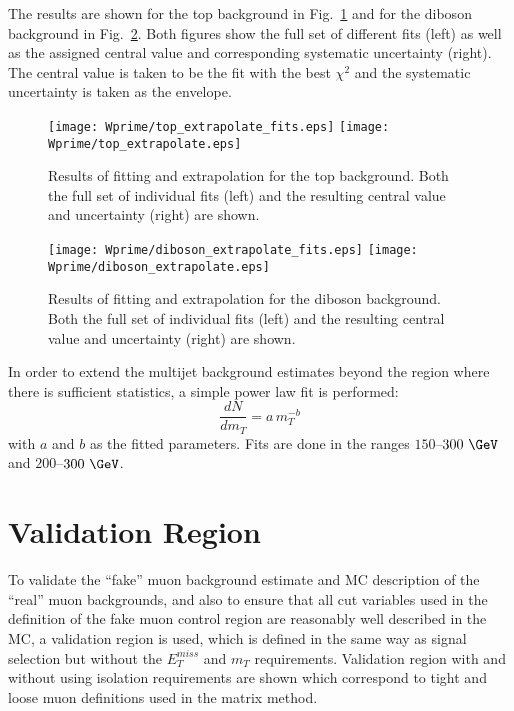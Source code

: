 The results are shown for the top background in
Fig.~\ref{fig:mu_extrapolate_top} and for the diboson background in Fig.~\ref{fig:mu_extrapolate_diboson}.
Both figures show the full set of different fits (left) as well as the assigned central value
and corresponding systematic uncertainty (right). The central value is taken to be the fit with the best $\chi^2$
and the systematic uncertainty is taken as the envelope.
\begin{figure}[!htb]
  \centering
  \texttt{[image: Wprime/top\_extrapolate\_fits.eps]}
  \texttt{[image: Wprime/top\_extrapolate.eps]}
  \caption{Results of fitting and extrapolation for the top background. Both the full set of individual
fits (left) and the resulting central value and uncertainty (right) are shown.}
  \label{fig:mu_extrapolate_top}
\end{figure}
\begin{figure}[!htb]
  \centering
  \texttt{[image: Wprime/diboson\_extrapolate\_fits.eps]}
  \texttt{[image: Wprime/diboson\_extrapolate.eps]}
  \caption{Results of fitting and extrapolation for the diboson background. Both the full set of individual
fits (left) and the resulting central value and uncertainty (right) are shown.}
  \label{fig:mu_extrapolate_diboson}
\end{figure}

In order to extend the multijet background estimates beyond the region where there is sufficient statistics, a simple power law fit is performed:
\begin{equation}
\frac{dN}{d m_T} = a\, m_T^{-b}
\end{equation}
with $a$ and $b$ as the fitted parameters. Fits are done in the ranges
$150$--$300~\GeV$ and $200$--$300~\GeV$.


\section{Validation Region}
To validate the ``fake'' muon background estimate and MC description of the ``real'' muon backgrounds, and also to ensure that
all cut variables used in the definition of the fake muon control region are reasonably
well described in the MC,
a validation region is used, which is defined in the same way as signal selection but without the $E_T^{miss}$ and $m_T$ requirements. Validation region with and without using isolation requirements
are shown which correspond to tight and loose muon definitions used in the matrix method.

